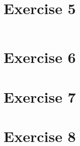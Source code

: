 \documentclass[12pt, a4paper]{article}
\begin{document}

\newpage
\section*{Exercise 5}%
\label{sec:exercise_5}

\begin{listing}[H]
  \inputminted[breaklines=true,fontsize=\footnotesize]{python}{../exercise5.py}
  \label{lst:exercise5}
  \caption{}
\end{listing}


\newpage
\section*{Exercise 6}%
\label{sec:exercise_6}




\newpage
\section*{Exercise 7}%
\label{sec:exercise_7}




\newpage
\section*{Exercise 8}%
\label{sec:exercise_8}



\end{document}
